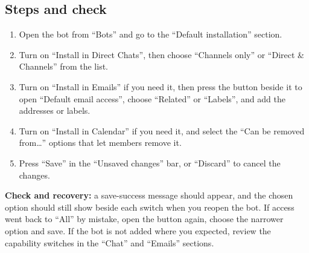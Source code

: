 \subsection{Steps and check}
\begin{enumerate}
\item Open the bot from “Bots” and go to the “Default installation” section.
\item Turn on “Install in Direct Chats”, then choose “Channels only” or “Direct \& Channels” from the list.
\item Turn on “Install in Emails” if you need it, then press the button beside it to open “Default email access”, choose “Related” or “Labels”, and add the addresses or labels.
\item Turn on “Install in Calendar” if you need it, and select the “Can be removed from…” options that let members remove it.
\item Press “Save” in the “Unsaved changes” bar, or “Discard” to cancel the changes.
\end{enumerate}

\textbf{Check and recovery:} a save-success message should appear, and the chosen option should still show beside each switch when you reopen the bot. If access went back to “All” by mistake, open the button again, choose the narrower option and save. If the bot is not added where you expected, review the capability switches in the “Chat” and “Emails” sections.
